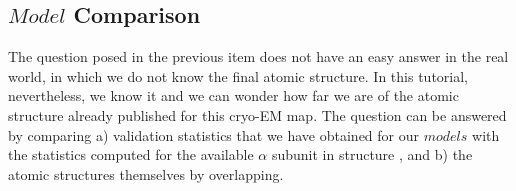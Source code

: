  \subsection*{$Model$ Comparison}
 
 The question posed in the previous item does not have an easy answer in the real world, in which we do not know the final atomic structure. In this tutorial, nevertheless, we know it and we can wonder how far we are of the atomic structure already published for this cryo-EM map. The question can be answered by comparing a) validation statistics that we have obtained for our $models$ with the statistics computed for the available $\alpha$ subunit in  structure , and b) the atomic structures themselves by overlapping.\\ 
    
